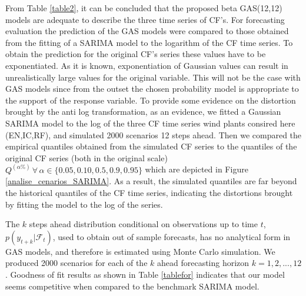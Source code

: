 \documentclass[a4paper]{IEEEtran}
\begin{document}
From Table \ref{table2}, it can be concluded that the proposed beta GAS(12,12) models are adequate to describe the three time series of CF's. For forecasting evaluation the prediction of the GAS models were compared to those obtained from the fitting of a SARIMA model to the logarithm of the CF time series. To obtain the prediction for the original CF's series these values have to be exponentiated. As it is known, exponentiation of Gaussian values can result in unrealistically large values for the original variable. This will not be the case with GAS models since from the outset the chosen probability model is appropriate to the support of the response variable. To provide some evidence on the distortion brought by the anti log transformation, as an evidence, we fitted a Gaussian SARIMA model to the log of the three CF time series wind plants consired here (EN,IC,RF), and simulated 2000 scenarios 12 steps ahead. Then we compared the empirical quantiles obtained from the simulated CF series to the quantiles of the original CF series (both in the original scale) $Q^{(\alpha\%)}\, \forall \,\alpha \in \{0.05, 0.10, 0.5, 0.9, 0.95 \}$ which are depicted in Figure \ref{analise_cenarios_SARIMA}.  As a result, the simulated quantiles are far beyond the historical quantiles of the CF time series, indicating the distortions brought by fitting the model to the log of the series.
	



The $k$ steps ahead distribution conditional on observations up to time $t$, $p(y_{t+k}|\mathcal{F}_{t} )$, used to obtain out of sample forecasts, has no analytical form in GAS models, and therefore is estimated using Monte Carlo simulation. We produced 2000 scenarios for each of the $k$ ahead forecasting horizon $k=1,2,...,12$. Goodness of fit results as shown in Table \ref{tablefor} indicates that our model seems competitive when compared to the benchmark SARIMA model.
\end{document}
